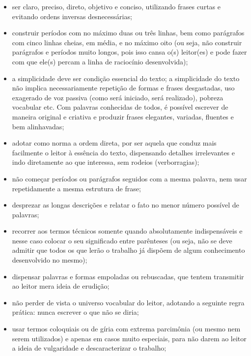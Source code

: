 \documentclass[
	12pt,			%
	openright,		%
	oneside,	
	a4paper,		%
	english,		%
	brazil			%
]{abntex2/abntex2}  %
\begin{document}
	\begin{itemize}
		\item ser claro, preciso, direto, objetivo e conciso, utilizando frases curtas e evitando ordens inversas desnecessárias;
		
		\item construir períodos com no máximo duas ou três linhas, bem como parágrafos com cinco linhas cheias, em média, e no máximo oito (ou seja, não construir parágrafos e períodos muito longos, pois isso cansa o(s) leitor(es) e pode fazer com que ele(s) percam a linha de raciocínio desenvolvida);
		
		\item a simplicidade deve ser condição essencial do texto; a simplicidade do texto não implica necessariamente repetição de formas e frases desgastadas, uso exagerado de voz passiva (como será iniciado, será realizado), pobreza vocabular etc. Com palavras conhecidas de todos, é possível escrever de maneira original e criativa e produzir frases elegantes, variadas, fluentes e bem alinhavadas;
		
		\item adotar como norma a ordem direta, por ser aquela que conduz mais facilmente o leitor à essência do texto, dispensando detalhes irrelevantes e indo diretamente ao que interessa, sem rodeios (verborragias);

		\item não começar períodos ou parágrafos seguidos com a mesma palavra, nem usar repetidamente a mesma estrutura de frase;

		\item desprezar as longas descrições e relatar o fato no menor número possível de palavras;
		
		\item recorrer aos termos técnicos somente quando absolutamente indispensáveis e nesse caso colocar o seu significado entre parênteses (ou seja, não se deve admitir que todos os que lerão o trabalho já dispõem de algum conhecimento desenvolvido no mesmo);
		
		\item dispensar palavras e formas empoladas ou rebuscadas, que tentem
transmitir ao leitor mera ideia de erudição;

		\item não perder de vista o universo vocabular do leitor, adotando a seguinte
regra prática: nunca escrever o que não se diria;

		\item usar termos coloquiais ou de gíria com extrema parcimônia (ou mesmo
nem serem utilizados) e apenas em casos muito especiais, para não darem ao leitor a ideia de vulgaridade e descaracterizar o trabalho;


\end{itemize}
\end{document}
